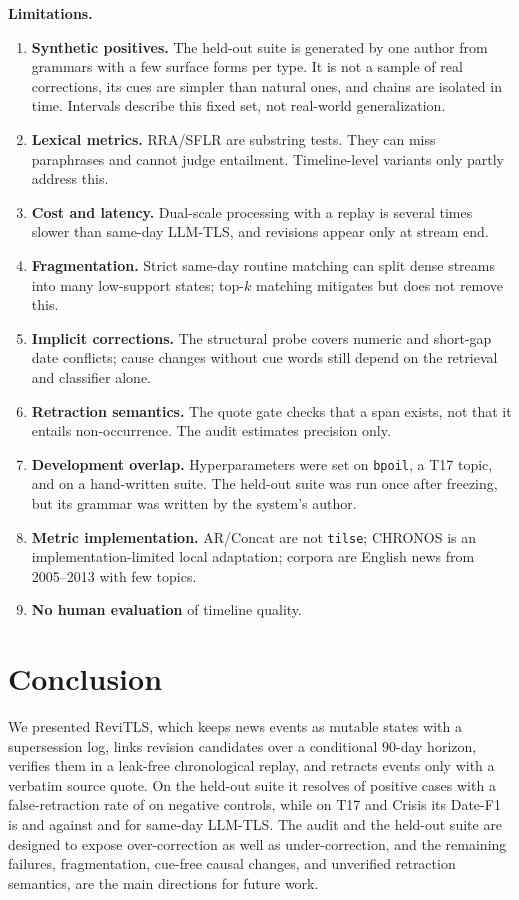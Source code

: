 \documentclass[journal]{IEEEtran}
\begin{document}
\textbf{Limitations.}
\begin{enumerate}
    \item \textbf{Synthetic positives.} The held-out suite is generated by one author from grammars with a few surface forms per type. It is not a sample of real corrections, its cues are simpler than natural ones, and chains are isolated in time. Intervals describe this fixed set, not real-world generalization.
    \item \textbf{Lexical metrics.} RRA/SFLR are substring tests. They can miss paraphrases and cannot judge entailment. Timeline-level variants only partly address this.
    \item \textbf{Cost and latency.} Dual-scale processing with a replay is several times slower than same-day LLM-TLS, and revisions appear only at stream end.
    \item \textbf{Fragmentation.} Strict same-day routine matching can split dense streams into many low-support states; top-$k$ matching mitigates but does not remove this.
    \item \textbf{Implicit corrections.} The structural probe covers numeric and short-gap date conflicts; cause changes without cue words still depend on the retrieval and classifier alone.
    \item \textbf{Retraction semantics.} The quote gate checks that a span exists, not that it entails non-occurrence. The audit estimates precision only.
    \item \textbf{Development overlap.} Hyperparameters were set on \texttt{bpoil}, a T17 topic, and on a hand-written suite. The held-out suite was run once after freezing, but its grammar was written by the system's author.
    \item \textbf{Metric implementation.} AR/Concat are not \texttt{tilse}; CHRONOS is an implementation-limited local adaptation; corpora are English news from 2005--2013 with few topics.
    \item \textbf{No human evaluation} of timeline quality.
\end{enumerate}

\section{Conclusion}
\label{sec:conclusion}

We presented ReviTLS, which keeps news events as mutable states with a supersession log, links revision candidates over a conditional $90$-day horizon, verifies them in a leak-free chronological replay, and retracts events only with a verbatim source quote. On the held-out suite it resolves \HeldFullK{} of \HeldPos{} positive cases with a false-retraction rate of \HeldFullFalseRetr{} on negative controls, while on T17 and Crisis its Date-F1 is \DateFTDual{} and \DateFCDual{} against \DateFTLSeven{} and \DateFCLSeven{} for same-day LLM-TLS. The audit and the held-out suite are designed to expose over-correction as well as under-correction, and the remaining failures, fragmentation, cue-free causal changes, and unverified retraction semantics, are the main directions for future work.
\end{document}
